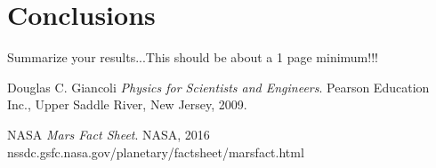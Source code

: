 \documentclass[11pt]{article}
\begin{document}
\section{Conclusions}
\noindent Summarize your results...This should be about a 1 page minimum!!!


\begin{thebibliography}{99}

Douglas C. Giancoli
\textit{Physics for Scientists and Engineers}. 
Pearson Education Inc., Upper Saddle River, New Jersey, 2009.

NASA
\textit{Mars Fact Sheet}. 
NASA, 2016
nssdc.gsfc.nasa.gov/planetary/factsheet/marsfact.html

\end{thebibliography}
\end{document}
